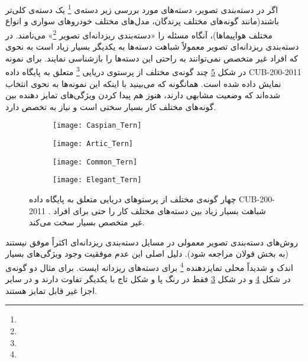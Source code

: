 \documentclass[11pt]{article}
\begin{document}
اگر در دسته‌بندی تصویر، دسته‌های مورد بررسی زیر دسته‌ی
\footnote{}
یک دسته‌ی کلی‌تر باشند(مانند گونه‌های مختلف پرندگان، مدل‌های مختلف خودروهای سواری و انواع مختلف هواپیماها)، آنگاه مسئله را «دسته‌بندی ریزدانه‌ای تصویر
\footnote{}»
می‌نامند. در دسته‌بندی ریزدانه‌ای تصویر معمولاً شباهت دسته‌ها به یکدیگر بسیار زیاد است به نحوی که افراد غیر متخصص نمی‌توانند به راحتی این دسته‌ها را بازشناسی نمایند. برای نمونه در شکل
\ref{fig:intro:terns}
چند گونه‌ی مختلف از پرستوی دریایی
\footnote{}
متعلق به پایگاه داده
CUB-200-2011 \cite{cub2002011}
نمایش داده شده است. همانگونه که می‌بینید با اینکه این نمونه‌ها به نحوی انتخاب شده‌اند که وضعیت مشابهی دارند، هنوز هم پیدا کردن ویژگی‌های تمایز دهنده بین گونه‌های مختلف کار بسیار سختی است و نیاز به تخصص دارد.

\begin{figure}[h]
	\centering
	\begin{subfigure}[h]{0.23\textwidth}
		\texttt{[image: Caspian\_Tern]}
		\caption{}
		\label{fig:intro:terns:1}
	\end{subfigure} 
	\begin{subfigure}[h]{0.23\textwidth}
		\texttt{[image: Artic\_Tern]}
		\caption{}
		\label{fig:intro:terns:2}
	\end{subfigure}
	\begin{subfigure}[h]{0.23\textwidth}
		\texttt{[image: Common\_Tern]}
		\caption{}
		\label{fig:intro:terns:3}
	\end{subfigure}
	\begin{subfigure}[h]{0.23\textwidth}
		\texttt{[image: Elegant\_Tern]}
		\caption{}
		\label{fig:intro:terns:4}
	\end{subfigure}
	\caption{چهار گونه‌ی مختلف از پرستوهای دریایی متعلق به پایگاه داده
CUB-200-2011 \cite{cub2002011}.
شباهت بسیار زیاد بین دسته‌های مختلف کار را حتی برای افراد غیر متخصص بسیار سخت می‌کند.
}
	\label{fig:intro:terns}
\end{figure}

روش‌های دسته‌بندی تصویر معمولی در مسايل دسته‌بندی ریزدانه‌ای اکثراً موفق نیستند (به بخش فولان مراجعه شود). دلیل اصلی این عدم موفقیت وجود ویژگی‌های بسیار اندک و شدیداً محلی تمایزدهنده
\footnote{}
برای دسته‌های ریزدانه ایست. برای مثال دو گونه‌ی
 در شکل \ref{fig:intro:terns:4}
و
 در شکل \ref{fig:intro:terns:3}
فقط در رنگ پا و شکل تاج با یکدیگر تفاوت دارند و در سایر اجزا غیر قابل تمایز هستند. 
\end{document}
